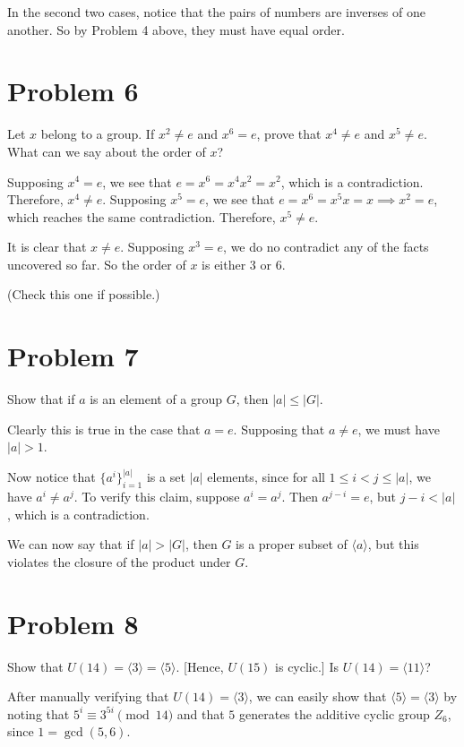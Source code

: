\documentclass[12pt]{article}
\begin{document}
In the second two cases, notice that the pairs of numbers are inverses of
one another.  So by Problem 4 above, they must have equal order.

\section*{Problem 6}

Let $x$ belong to a group.  If $x^2\neq e$ and $x^6=e$, prove that
$x^4\neq e$ and $x^5\neq e$.  What can we say about the order of $x$?

Supposing $x^4=e$, we see that $e=x^6=x^4x^2=x^2$, which is a contradiction.
Therefore, $x^4\neq e$.  Supposing $x^5=e$, we see that $e=x^6=x^5x=x\implies x^2=e$,
which reaches the same contradiction.  Therefore, $x^5\neq e$.

It is clear that $x\neq e$.  Supposing $x^3=e$, we do no contradict any of the facts
uncovered so far.  So the order of $x$ is either 3 or 6.

(Check this one if possible.)

\section*{Problem 7}

Show that if $a$ is an element of a group $G$, then $|a|\leq|G|$.

Clearly this is true in the case that $a=e$. Supposing that $a\neq e$,
we must have $|a|>1$.

Now notice that $\{a^i\}_{i=1}^{|a|}$ is a set $|a|$ elements, since for all $1\leq i<j\leq |a|$,
we have $a^i\neq a^j$.  To verify this claim, suppose $a^i=a^j$.
Then $a^{j-i}=e$, but $j-i<|a|$, which is a contradiction.

We can now say that if $|a|>|G|$, then $G$ is a proper subset of $\langle a\rangle$, but this violates the closure of
the product under $G$.

\section*{Problem 8}

Show that $U(14)=\langle 3\rangle=\langle 5\rangle$.  [Hence, $U(15)$ is cyclic.]
Is $U(14)=\langle 11\rangle$?

After manually verifying that $U(14)=\langle 3\rangle$, we can easily
show that $\langle 5\rangle=\langle 3\rangle$ by noting that $5^i\equiv 3^{5i}\pmod{14}$
and that $5$ generates the additive cyclic group $Z_6$, since $1=\gcd(5,6)$.
\end{document}
